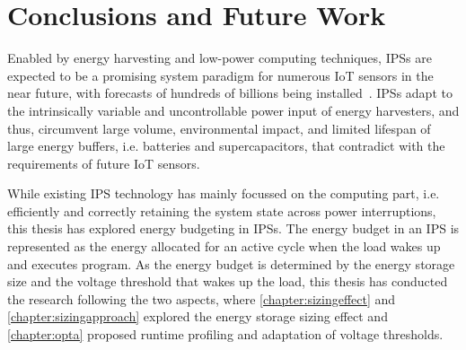 \chapter{Conclusions and Future Work} \label{chapter:conclusion}

Enabled by energy harvesting and low-power computing techniques, IPSs are expected to be a promising system paradigm for numerous IoT sensors in the near future, with forecasts of hundreds of billions being installed~\cite{sparks2017trillion}.
IPSs adapt to the intrinsically variable and uncontrollable power input of energy harvesters, and thus, circumvent large volume, environmental impact, and limited lifespan of large energy buffers, i.e. batteries and supercapacitors, that contradict with the requirements of future IoT sensors.

While existing IPS technology has mainly focussed on the computing part, i.e. efficiently and correctly retaining the system state across power interruptions, this thesis has explored energy budgeting in IPSs. 
The energy budget in an IPS is represented as the energy allocated for an active cycle when the load wakes up and executes program. 
As the energy budget is determined by the energy storage size and the voltage threshold that wakes up the load, this thesis has conducted the research following the two aspects, where \cref{chapter:sizingeffect} and \cref{chapter:sizingapproach} explored the energy storage sizing effect and \cref{chapter:opta} proposed runtime profiling and adaptation of voltage thresholds. 


